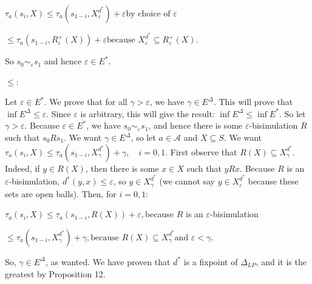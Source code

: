 \documentclass[10pt,a4paper]{article}
\begin{document}
\par  \quad  $\displaystyle\tau_{a}(s_{i},X)$\quad  $\displaystyle\leq\tau_{a}(s_{1-i},X_{\varepsilon}^{d^{*}})+\varepsilon$\quad  $\displaystyle\mbox{by choice of }\varepsilon$\quad  \quad  
 
\par  \quad  \quad  $\displaystyle\leq\tau_{a}(s_{1-i},R^{+}_{\varepsilon}(X))+\varepsilon$\quad  $\displaystyle\mbox{because }X_{\varepsilon}^{d^{*}}\subseteq R^{+}_{\varepsilon}(X).$\quad  \quad  
  
So $s_{0}\sim_{\varepsilon}s_{1}$ and hence $\varepsilon\in E^{*}$.\par
 
  $\leq$:  
 
Let $\varepsilon\in E^{*}$. We prove that for all $\gamma>\varepsilon$, we have $\gamma\in E^{\Delta}$. This will prove that $\inf E^{\Delta}\leq\varepsilon$. Since $\varepsilon$ is arbitrary, this will give the result: $\inf E^{\Delta}\leq\inf E^{*}$. So let $\gamma>\varepsilon$. Because $\varepsilon\in E^{*}$, we have $s_{0}\sim_{\varepsilon}s_{1}$, and hence there is some $\varepsilon$-bisimulation $R$ such that $s_{0}Rs_{1}$. We want $\gamma\in E^{\Delta}$, so let $a\in\mathcal{A}$ and $X\subseteq S$. We want $\tau_{a}(s_{i},X)\leq\tau_{a}(s_{1-i},X^{d^{*}}_{\gamma})+\gamma,\quad i=0,1$. First observe that $R(X)\subseteq X^{d^{*}}_{\gamma}$. Indeed, if $y\in R(X)$, then there is some $x\in X$ such that $yRx$. Because $R$ is an $\varepsilon$-bisimulation, $d^{*}(y,x)\leq\varepsilon$, so $y\in X^{d^{*}}_{\gamma}$ (we cannot say $y\in X^{d^{*}}_{\varepsilon}$ because these sets are open balls). Then, for $i=0,1$:\par
  
\par  \quad  $\displaystyle\tau_{a}(s_{i},X)$\quad  $\displaystyle\leq\tau_{a}(s_{1-i},R(X))+\varepsilon,$\quad  because $R$ is an $\varepsilon$-bisimulation\quad  \quad  
 
\par  \quad  \quad  $\displaystyle\leq\tau_{a}(s_{1-i},X^{d^{*}}_{\gamma})+\gamma,$\quad  $\displaystyle\mbox{because }R(X)\subseteq X^{d^{*}}_{\gamma}\mbox{and }\varepsilon<\gamma.$\quad  \quad  
  
So, $\gamma\in E^{\Delta}$, as wanted. We have proven that $d^{*}$ is a fixpoint of $\Delta_{LP}$, and it is the greatest by Proposition 12.\par
 
   
\end{document}
